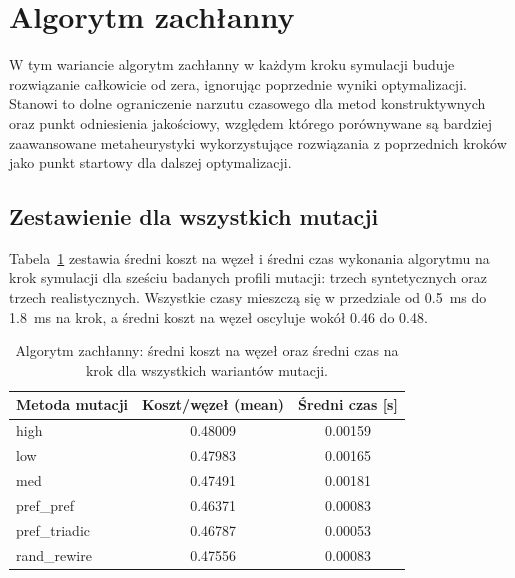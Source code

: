 \section{Algorytm zachłanny}

W tym wariancie algorytm zachłanny w każdym kroku symulacji buduje rozwiązanie całkowicie od zera, ignorując poprzednie wyniki optymalizacji. Stanowi to dolne ograniczenie narzutu czasowego dla metod konstruktywnych oraz punkt odniesienia jakościowy, względem którego porównywane są bardziej zaawansowane metaheurystyki wykorzystujące rozwiązania z poprzednich kroków jako punkt startowy dla dalszej optymalizacji.

\subsection{Zestawienie dla wszystkich mutacji}
Tabela~\ref{tab:greedy-cold-summary} zestawia średni koszt na węzeł i średni czas wykonania algorytmu na krok symulacji dla sześciu badanych profili mutacji: trzech syntetycznych oraz trzech realistycznych. Wszystkie czasy mieszczą się w przedziale od \SI{0.5}{\milli\second} do \SI{1.8}{\milli\second} na krok, a średni koszt na węzeł oscyluje wokół 0.46 do 0.48.

\begin{table}[H]
  \centering
  \caption{Algorytm zachłanny: średni koszt na węzeł oraz średni czas na krok dla wszystkich wariantów mutacji.}
  \label{tab:greedy-cold-summary}
  \begin{tabular}{lcc}
    \toprule
    \textbf{Metoda mutacji} & \textbf{Koszt/węzeł (mean)} & \textbf{Średni czas [s]} \\
    \midrule
    high                    & 0.48009                     & 0.00159                  \\
    low                     & 0.47983                     & 0.00165                  \\
    med                     & 0.47491                     & 0.00181                  \\
    pref\_pref              & 0.46371                     & 0.00083                  \\
    pref\_triadic           & 0.46787                     & 0.00053                  \\
    rand\_rewire            & 0.47556                     & 0.00083                  \\
    \bottomrule
  \end{tabular}
\end{table}

